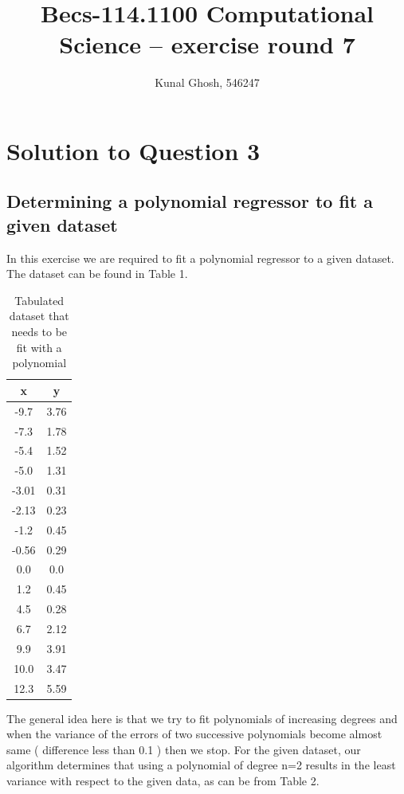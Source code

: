 \documentclass[a4paper,11pt]{article}
\begin{document}
\title{Becs-114.1100 Computational Science -- exercise round 7} %
\author{Kunal Ghosh, 546247} %
\maketitle
\section{Solution to Question 3}
\subsection{Determining a polynomial regressor to fit a given dataset}\label{prob3a}
In this exercise we are required to fit a polynomial regressor to a given dataset. The dataset can be found in Table 1. 
\begin{table}[ht]
\centering
\label{initial-label}
\begin{tabular}{|c|c|}
\hline
 \textbf{x}&\textbf{y} \\ \hline
-9.7 & 3.76 \\
-7.3 & 1.78 \\
-5.4 & 1.52 \\
-5.0 & 1.31 \\
-3.01 & 0.31 \\
-2.13 & 0.23 \\
-1.2 & 0.45 \\
-0.56 & 0.29 \\
0.0 & 0.0 \\
1.2 & 0.45 \\
4.5 & 0.28 \\
6.7 & 2.12 \\
9.9 & 3.91 \\
10.0 & 3.47 \\
12.3 & 5.59 \\
\hline
\end{tabular}
\caption{Tabulated dataset that needs to be fit with a polynomial}
\end{table}

 The general idea here is that we try to fit polynomials of increasing degrees and when the variance of the errors of two successive polynomials become almost same ( difference less than 0.1 ) then we stop. For the given dataset, our algorithm determines that using a polynomial of degree n=2 results in the least variance with respect to the given data, as can be from Table 2.
\end{document}
